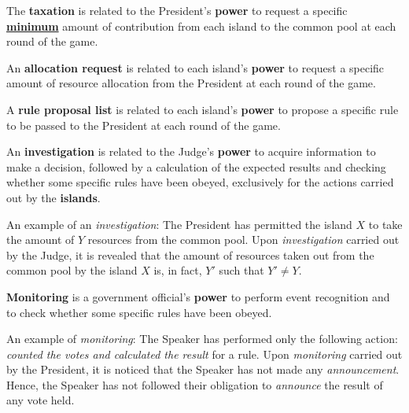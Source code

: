 

\begin{definition} \label{def:tax}
    The \textbf{taxation} is related to the President's \textbf{power} to request a specific \underline{\textbf{minimum}} amount of contribution from each island to the common pool at each round of the game. 
\end{definition}

\begin{definition} \label{def:alloc_req}
    An \textbf{allocation request} is related to each island's \textbf{power} to request a specific amount of resource allocation from the President at each round of the game.
\end{definition}


\begin{definition} \label{def:rule_prop_list}
A \textbf{rule proposal list} is related to each island's \textbf{power} to propose a specific rule to be passed to the President at each round of the game.
\end{definition}

\begin{definition} \label{def:invst}
    An \textbf{investigation} is related to the Judge's \textbf{power} to acquire information to make a decision, followed by a calculation of the expected results and checking whether some specific rules have been obeyed, exclusively for the actions carried out by the \textbf{islands}. 
\end{definition}


An example of an \emph{investigation}: The President has permitted the island $X$ to take the amount of $Y$ resources from the common pool. Upon \emph{investigation} carried out by the Judge, it is revealed that the amount of resources taken out from the common pool by the island $X$ is, in fact, $Y'$ such that $Y' \neq Y$.


\begin{definition}
\textbf{Monitoring} is a government official's \textbf{power} to perform event recognition and to check whether some specific rules have been obeyed.
\end{definition}

An example of \emph{monitoring}: The Speaker has performed only the following action: \emph{counted the votes and calculated the result} for a rule. Upon \emph{monitoring} carried out by the President, it is noticed that the Speaker has not made any \emph{announcement}. Hence, the Speaker has not followed their obligation to \emph{announce} the result of any vote held.

